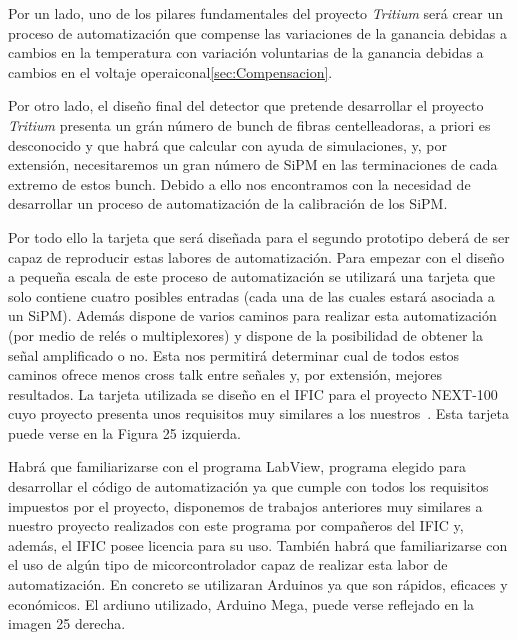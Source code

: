 \begin{enumerate}
Por un lado, uno de los pilares fundamentales del proyecto \textit{Tritium} será crear un proceso de automatización que compense las variaciones de la ganancia debidas a cambios en la temperatura con variación voluntarias de la ganancia debidas a cambios en el voltaje operaiconal\ref{sec:Compensacion}.

Por otro lado, el diseño final del detector que pretende desarrollar el proyecto \textit{Tritium} presenta un grán número de bunch de fibras centelleadoras, a priori es desconocido y que habrá que calcular con ayuda de simulaciones, y, por extensión, necesitaremos un gran número de SiPM en las terminaciones de cada extremo de estos bunch. Debido a ello nos encontramos con la necesidad de desarrollar un proceso de automatización de la calibración de los SiPM.  

Por todo ello la tarjeta que será diseñada para el segundo prototipo deberá de ser capaz de reproducir estas labores de automatización. Para empezar con el diseño a pequeña escala de este proceso de automatización se utilizará una tarjeta que solo contiene cuatro posibles entradas (cada una de las cuales estará asociada a un SiPM). Además dispone de varios caminos para realizar esta automatización (por medio de relés o multiplexores) y dispone de la posibilidad de obtener la señal amplificado o no. Esta nos permitirá determinar cual de todos estos caminos ofrece menos cross talk entre señales y, por extensión, mejores resultados. La tarjeta utilizada se diseño en el IFIC para el proyecto NEXT-100 cuyo proyecto presenta unos requisitos muy similares a los nuestros~\cite{Marc}. Esta tarjeta puede verse en la Figura 25 izquierda.

Habrá que familiarizarse con el programa LabView, programa elegido para desarrollar el código de automatización ya que cumple con todos los requisitos impuestos por el proyecto, disponemos de trabajos anteriores muy similares a nuestro proyecto realizados con este programa por compañeros del IFIC y, además, el IFIC posee licencia para su uso. También habrá que familiarizarse con el uso de algún tipo de micorcontrolador capaz de realizar esta labor de automatización. En concreto se utilizaran Arduinos ya que son rápidos, eficaces y económicos. El ardiuno utilizado, Arduino Mega, puede verse reflejado en la imagen 25 derecha.


\end{enumerate}
